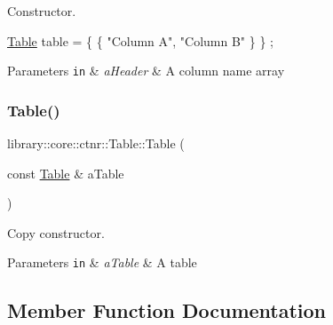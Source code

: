 Constructor. 


\begin{DoxyCode}
\hyperlink{classlibrary_1_1core_1_1ctnr_1_1_table_a5b11121caa4288c3da642af7c6a5a632}{Table} table = \{ \{ \textcolor{stringliteral}{"Column A"}, \textcolor{stringliteral}{"Column B"} \} \} ;
\end{DoxyCode}



\begin{DoxyParams}[1]{Parameters}
\mbox{\tt in}  & {\em a\+Header} & A column name array \\
\hline
\end{DoxyParams}
\mbox{\label{classlibrary_1_1core_1_1ctnr_1_1_table_afaaf450a1a4949b48b6290460137921e}} 
\subsubsection{\texorpdfstring{Table()}{Table()}\hspace{0.1cm}{\footnotesize\ttfamily [3/3]}}
{\footnotesize\ttfamily library\+::core\+::ctnr\+::\+Table\+::\+Table (\begin{DoxyParamCaption}\item[{const \hyperlink{classlibrary_1_1core_1_1ctnr_1_1_table}{Table} \&}]{a\+Table }\end{DoxyParamCaption})}



Copy constructor. 


\begin{DoxyParams}[1]{Parameters}
\mbox{\tt in}  & {\em a\+Table} & A table \\
\hline
\end{DoxyParams}


\subsection{Member Function Documentation}
\mbox{\label{classlibrary_1_1core_1_1ctnr_1_1_table_a9c9b8b7a2eca260d58b721c4f465a7d3}} 
